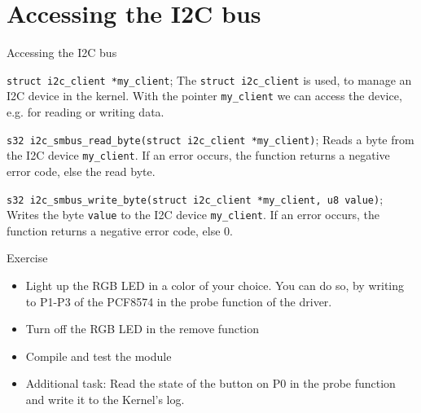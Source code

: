 \documentclass[aspectratio=169]{beamer}
\begin{document}
\section{Accessing the I2C bus}
\begin{frame}{Accessing the I2C bus}

\begin{block} {
                \lstinline|struct i2c_client *my_client|;
        }
		The \lstinline|struct i2c_client| is used, to manage an I2C device in the kernel. With the pointer \lstinline|my_client| we can access the device, e.g. for reading or writing data.
\end{block}

\begin{block} {
		\lstinline|s32 i2c_smbus_read_byte(struct i2c_client *my_client)|;
        }
	Reads a byte from the I2C device \lstinline|my_client|. If an error occurs, the function returns a negative error code, else the read byte.
\end{block}

\begin{block} {
		\lstinline|s32 i2c_smbus_write_byte(struct i2c_client *my_client, u8 value)|;
        }
	Writes the byte \lstinline|value| to the I2C device \lstinline|my_client|. If an error occurs, the function returns a negative error code, else 0.
\end{block}
\end{frame}

\begin{frame}{Exercise}
	\begin{itemize}	
		\item Light up the RGB LED in a color of your choice. You can do so, by writing to P1-P3 of the PCF8574 in the probe function of the driver.
		\item Turn off the RGB LED in the remove function
		\item Compile and test the module
		\item Additional task: Read the state of the button on P0 in the probe function and write it to the Kernel's log.
	\end{itemize}	
\end{frame}
\end{document}
